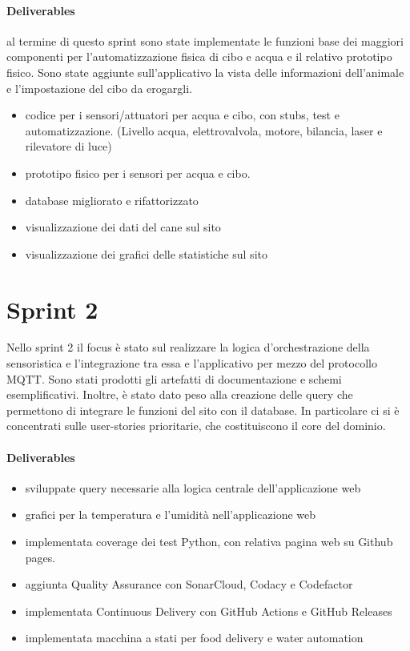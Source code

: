 \paragraph{Deliverables}
al termine di questo sprint sono state implementate le funzioni base dei maggiori componenti per l'automatizzazione fisica di cibo e acqua e il relativo prototipo fisico. Sono state aggiunte sull'applicativo la vista delle informazioni dell'animale e l'impostazione del cibo da erogargli. 
\begin{itemize}
    \item codice per i sensori/attuatori per acqua e cibo, con stubs, test e automatizzazione. (Livello acqua, elettrovalvola, motore, bilancia, laser e rilevatore di luce)
    \item prototipo fisico per i sensori per acqua e cibo. 
    \item database migliorato e rifattorizzato
    \item visualizzazione dei dati del cane sul sito 
    \item visualizzazione dei grafici delle statistiche sul sito 
\end{itemize}

\section{Sprint 2}
Nello sprint 2 il focus è stato sul realizzare la logica d'orchestrazione della sensoristica e l'integrazione tra essa e l'applicativo per mezzo del protocollo MQTT. Sono stati prodotti gli artefatti di documentazione e schemi esemplificativi. Inoltre, è stato dato peso alla creazione delle query che permettono di integrare le funzioni del sito con il database. In particolare ci si è concentrati sulle user-stories prioritarie, che costituiscono il core del dominio.
\paragraph{Deliverables}
\begin{itemize}
    \item sviluppate query necessarie alla logica centrale dell'applicazione web
    \item grafici per la temperatura e l'umidità nell'applicazione web
    \item implementata coverage dei test Python, con relativa pagina web su Github pages. 
    \item aggiunta Quality Assurance con SonarCloud, Codacy e Codefactor
    \item implementata Continuous Delivery con GitHub Actions e GitHub Releases
    \item implementata macchina a stati per food delivery e water automation
\end{itemize}

